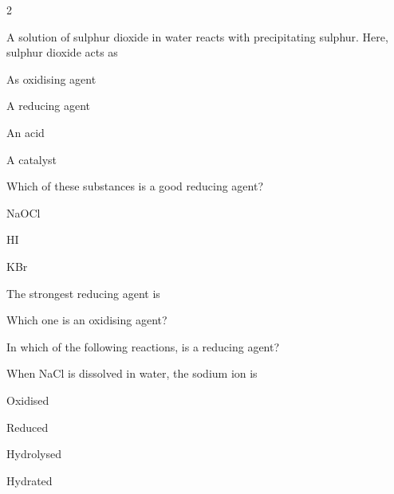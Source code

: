 \documentclass[10pt,a4paper]{article}
\begin{document}
\begin{multicols}{2}
\begin{questions}[start=1]
\item A solution of sulphur dioxide in water reacts with  precipitating sulphur. Here, sulphur dioxide acts as
\begin{options}
  \item As oxidising agent
  \item A reducing agent
  \item An acid
  \item A catalyst
\end{options}

\item Which of these substances is a good reducing agent?
\begin{options}
  \item NaOCl
  \item HI
  \item {}
  \item KBr
\end{options}

\item The strongest reducing agent is
\begin{options}
  \item {}
  \item {}
  \item {}
  \item {}
\end{options}

\item Which one is an oxidising agent?
\begin{options}
  \item {}
  \item {}
  \item {}
  \item {}
\end{options}

\item In which of the following reactions,  is a reducing agent?
\begin{options}
  \item {}
  \item {}
  \item {}
  \item {}
\end{options}

\item When NaCl is dissolved in water, the sodium ion is
\begin{options}
  \item Oxidised
  \item Reduced
  \item Hydrolysed
  \item Hydrated
\end{options}


\end{questions}
\end{multicols}
\end{document}
